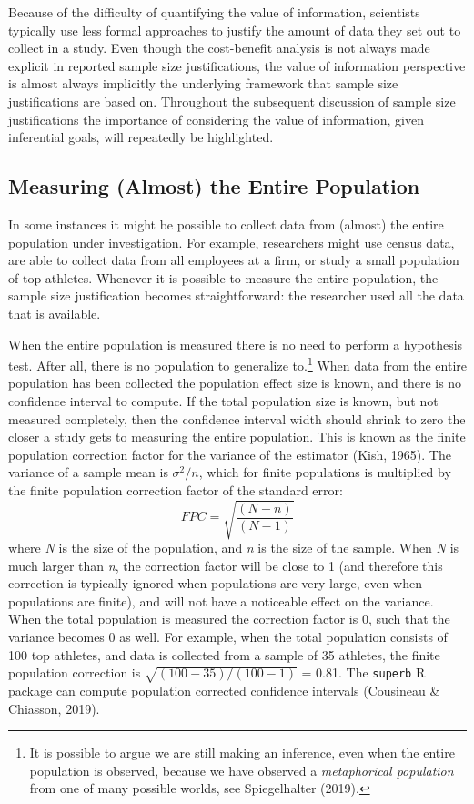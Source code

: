 \documentclass[
  english,
  ,jou, a4paper,floatsintext]{apa6}
\begin{document}
Because of the difficulty of quantifying the value of information, scientists typically use less formal approaches to justify the amount of data they set out to collect in a study. Even though the cost-benefit analysis is not always made explicit in reported sample size justifications, the value of information perspective is almost always implicitly the underlying framework that sample size justifications are based on. Throughout the subsequent discussion of sample size justifications the importance of considering the value of information, given inferential goals, will repeatedly be highlighted.

\hypertarget{measuring-almost-the-entire-population}{%
\subsection{Measuring (Almost) the Entire Population}\label{measuring-almost-the-entire-population}}

In some instances it might be possible to collect data from (almost) the entire population under investigation. For example, researchers might use census data, are able to collect data from all employees at a firm, or study a small population of top athletes. Whenever it is possible to measure the entire population, the sample size justification becomes straightforward: the researcher used all the data that is available.

When the entire population is measured there is no need to perform a hypothesis test. After all, there is no population to generalize to.\footnote{It is possible to argue we are still making an inference, even when the entire population is observed, because we have observed a \emph{metaphorical population} from one of many possible worlds, see Spiegelhalter (2019).} When data from the entire population has been collected the population effect size is known, and there is no confidence interval to compute. If the total population size is known, but not measured completely, then the confidence interval width should shrink to zero the closer a study gets to measuring the entire population. This is known as the finite population correction factor for the variance of the estimator (Kish, 1965). The variance of a sample mean is \(\sigma^2/n\), which for finite populations is multiplied by the finite population correction factor of the standard error:
\[FPC = \sqrt{\frac{(N - n)}{(N-1)}}\]
where \emph{N} is the size of the population, and \emph{n} is the size of the sample. When \emph{N} is much larger than \emph{n}, the correction factor will be close to 1 (and therefore this correction is typically ignored when populations are very large, even when populations are finite), and will not have a noticeable effect on the variance. When the total population is measured the correction factor is 0, such that the variance becomes 0 as well. For example, when the total population consists of 100 top athletes, and data is collected from a sample of 35 athletes, the finite population correction is \(\sqrt{(100 - 35)/(100-1)}\) = 0.81. The \texttt{superb} R package can compute population corrected confidence intervals (Cousineau \& Chiasson, 2019).
\end{document}
